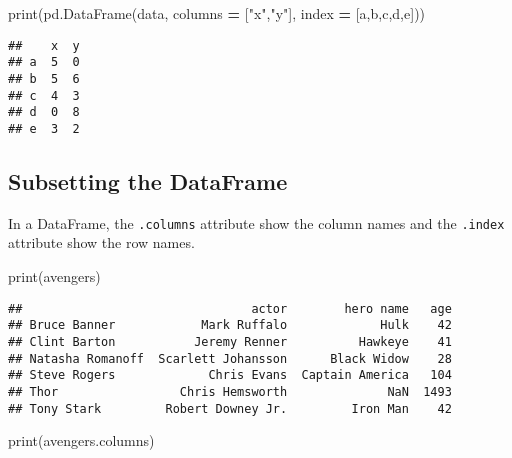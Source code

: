 \documentclass[
]{book}
\newenvironment{Shaded}{\begin{snugshade}}{\end{snugshade}}
\newcommand{\BuiltInTok}[1]{#1}
\newcommand{\NormalTok}[1]{#1}
\newcommand{\OperatorTok}[1]{\textcolor[rgb]{0.81,0.36,0.00}{\textbf{#1}}}
\newcommand{\StringTok}[1]{\textcolor[rgb]{0.31,0.60,0.02}{#1}}
\begin{document}
\begin{Shaded}
\begin{Highlighting}[]
\BuiltInTok{print}\NormalTok{(pd.DataFrame(data, columns }\OperatorTok{=}\NormalTok{ [}\StringTok{"x"}\NormalTok{,}\StringTok{"y"}\NormalTok{], index }\OperatorTok{=}\NormalTok{ [}\StringTok{\textquotesingle{}a\textquotesingle{}}\NormalTok{,}\StringTok{\textquotesingle{}b\textquotesingle{}}\NormalTok{,}\StringTok{\textquotesingle{}c\textquotesingle{}}\NormalTok{,}\StringTok{\textquotesingle{}d\textquotesingle{}}\NormalTok{,}\StringTok{\textquotesingle{}e\textquotesingle{}}\NormalTok{]))}
\end{Highlighting}
\end{Shaded}

\begin{verbatim}
##    x  y
## a  5  0
## b  5  6
## c  4  3
## d  0  8
## e  3  2
\end{verbatim}

\hypertarget{subsetting-the-dataframe}{%
\subsection{Subsetting the DataFrame}\label{subsetting-the-dataframe}}

In a DataFrame, the \texttt{.columns} attribute show the column names and the \texttt{.index} attribute
show the row names.

\begin{Shaded}
\begin{Highlighting}[]
\BuiltInTok{print}\NormalTok{(avengers)}
\end{Highlighting}
\end{Shaded}

\begin{verbatim}
##                                actor        hero name   age
## Bruce Banner            Mark Ruffalo             Hulk    42
## Clint Barton           Jeremy Renner          Hawkeye    41
## Natasha Romanoff  Scarlett Johansson      Black Widow    28
## Steve Rogers             Chris Evans  Captain America   104
## Thor                 Chris Hemsworth              NaN  1493
## Tony Stark         Robert Downey Jr.         Iron Man    42
\end{verbatim}

\begin{Shaded}
\begin{Highlighting}[]
\BuiltInTok{print}\NormalTok{(avengers.columns)}
\end{Highlighting}
\end{Shaded}
\end{document}
